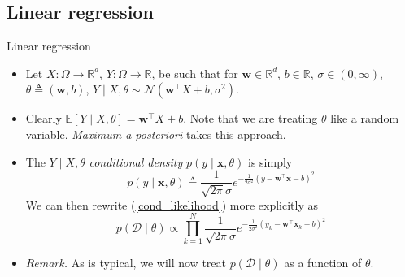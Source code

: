 \documentclass{beamer}
\numberwithin{equation}{section}
\newcommand{\aref}[1]{\alert{\ref{#1}}}
\begin{document}
\subsection{Linear regression}

\begin{frame}{Linear regression}
    \begin{itemize}
        \item
        Let $ X : \Omega \rightarrow \mathbb{R}^d $,
        $ Y : \Omega \rightarrow \mathbb{R} $, be such that for
        $ \mathbf{w} \in \mathbb{R}^d $, $ b \in \mathbb{R} $,
        $ \sigma \in (0, \infty) $, $ \theta \triangleq (\mathbf{w}, b) $,
        $ Y \mid X, \theta \sim \mathcal{N}\left(
        \mathbf{w}^\top X + b, \sigma^2\right) $.

        \item
        Clearly $ \mathbb{E}[Y \mid X, \theta] = \mathbf{w}^\top X + b $. Note
        that we are treating $ \theta $ like a random variable.
        \textit{Maximum a posteriori} takes this approach.

        \item
        The $ Y \mid X, \theta $ \textit{conditional density}
        $ p(y \mid \mathbf{x}, \theta) $ is simply
       \begin{equation} \label{linreg_density}
           p(y \mid \mathbf{x}, \theta) \triangleq
	           \frac{1}{\sqrt{2\pi}\sigma}
	           e^{-\frac{1}{2\sigma^2}\left(
	               y - \mathbf{w}^\top\mathbf{x} - b
               \right)^2}
       \end{equation}
       We can then rewrite (\aref{cond_likelihood}) more explicitly as
       \begin{equation} \label{linreg_like}
           p(\mathcal{D} \mid \theta) \propto
               \prod_{k = 1}^N\frac{1}{\sqrt{2\pi}\sigma}
               e^{-\frac{1}{2\sigma^2}\left(
                   y_k - \mathbf{w}^\top\mathbf{x}_k - b
               \right)^2}
       \end{equation}

        \item
        \textit{Remark.} As is typical, we will now treat
        $ p(\mathcal{D} \mid \theta) $ as a function of $ \theta $.
    \end{itemize}
\end{frame}
\end{document}
